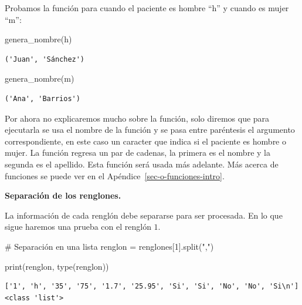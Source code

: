 \documentclass[
  spanish,
  letterpaper,
]{scrbook}
\newenvironment{Shaded}{\begin{snugshade}}{\end{snugshade}}
\newcommand{\BuiltInTok}[1]{\textcolor[rgb]{0.00,0.23,0.31}{#1}}
\newcommand{\CommentTok}[1]{\textcolor[rgb]{0.37,0.37,0.37}{#1}}
\newcommand{\DecValTok}[1]{\textcolor[rgb]{0.68,0.00,0.00}{#1}}
\newcommand{\NormalTok}[1]{\textcolor[rgb]{0.00,0.23,0.31}{#1}}
\newcommand{\OperatorTok}[1]{\textcolor[rgb]{0.37,0.37,0.37}{#1}}
\newcommand{\StringTok}[1]{\textcolor[rgb]{0.13,0.47,0.30}{#1}}
\theoremstyle{definition}
\theoremstyle{remark}
\begin{document}
Probamos la función para cuando el paciente es hombre ``h'' y cuando es
mujer ``m'':

\begin{Shaded}
\begin{Highlighting}[]
\NormalTok{genera\_nombre(}\StringTok{\textquotesingle{}h\textquotesingle{}}\NormalTok{)}
\end{Highlighting}
\end{Shaded}

\begin{verbatim}
('Juan', 'Sánchez')
\end{verbatim}

\begin{Shaded}
\begin{Highlighting}[]
\NormalTok{genera\_nombre(}\StringTok{\textquotesingle{}m\textquotesingle{}}\NormalTok{)}
\end{Highlighting}
\end{Shaded}

\begin{verbatim}
('Ana', 'Barrios')
\end{verbatim}

Por ahora no explicaremos mucho sobre la función, solo diremos que para
ejecutarla se usa el nombre de la función y se pasa entre paréntesis el
argumento correspondiente, en este caso un caracter que indica si el
paciente es hombre o mujer. La función regresa un par de cadenas, la
primera es el nombre y la segunda es el apellido. Esta función será
usada más adelante. Más acerca de funciones se puede ver en el
Apéndice~\ref{sec-o-funciones-intro}.

\textbf{Separación de los renglones.}

La información de cada renglón debe separarse para ser procesada. En lo
que sigue haremos una prueba con el renglón \(1\).

\begin{Shaded}
\begin{Highlighting}[]
\CommentTok{\# Separación en una lista}
\NormalTok{renglon }\OperatorTok{=}\NormalTok{ renglones[}\DecValTok{1}\NormalTok{].split(}\StringTok{","}\NormalTok{)}

\BuiltInTok{print}\NormalTok{(renglon, }\BuiltInTok{type}\NormalTok{(renglon))}
\end{Highlighting}
\end{Shaded}

\begin{verbatim}
['1', 'h', '35', '75', '1.7', '25.95', 'Si', 'Si', 'No', 'No', 'Si\n'] <class 'list'>
\end{verbatim}
\end{document}

